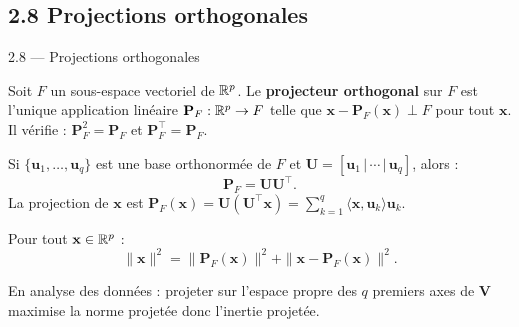 \subsection{2.8 Projections orthogonales}
\begin{frame}{2.8 — Projections orthogonales}
\begin{definition}
Soit $F$ un sous-espace vectoriel de $\mathbb{R}^p$. Le \textbf{projecteur orthogonal}
sur $F$ est l'unique application linéaire $\mathbf{P}_F : \mathbb{R}^p \to F$ telle que
$\mathbf{x} - \mathbf{P}_F(\mathbf{x}) \perp F$ pour tout $\mathbf{x}$.
Il vérifie : $\mathbf{P}_F^2 = \mathbf{P}_F$ et $\mathbf{P}_F^\top = \mathbf{P}_F$.
\end{definition}

\begin{prop}
Si $\{\mathbf{u}_1, \ldots, \mathbf{u}_q\}$ est une base orthonormée de $F$ et
$\mathbf{U} = [\mathbf{u}_1 \,|\, \cdots \,|\, \mathbf{u}_q]$, alors :
\[
\mathbf{P}_F = \mathbf{U} \mathbf{U}^\top.
\]
La projection de $\mathbf{x}$ est $\mathbf{P}_F(\mathbf{x}) = \mathbf{U}(\mathbf{U}^\top \mathbf{x}) = \sum_{k=1}^q \langle \mathbf{x}, \mathbf{u}_k\rangle \mathbf{u}_k$.
\end{prop}

\begin{theorem}
Pour tout $\mathbf{x} \in \mathbb{R}^p$ :
\[
\|\mathbf{x}\|^2 = \|\mathbf{P}_F(\mathbf{x})\|^2 + \|\mathbf{x} - \mathbf{P}_F(\mathbf{x})\|^2.
\]
\end{theorem}

\begin{rema}
\small En analyse des données : projeter sur l'espace propre des $q$ premiers axes
de $\mathbf{V}$ \alert{maximise} la norme projetée donc l'inertie projetée.
\end{rema}
\end{frame}

